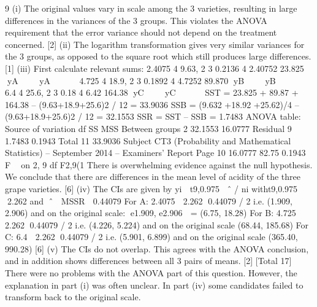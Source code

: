 9 (i) The original values vary in scale among the 3 varieties, resulting in large
differences in the variances of the 3 groups. This violates the ANOVA
requirement that the error variance should not depend on the treatment
concerned. [2]
(ii) The logarithm transformation gives very similar variances for the 3 groups, as
opposed to the square root which still produces large differences. [1]
(iii) First calculate relevant sums:
  2.4075 4 9.63, 2 3 0.2136 4 2.40752 23.825 yA    yA     
4.725 4 18.9, 2 3 0.1892 4 4.7252 89.870 yB    yB     
6.4 4 25.6, 2 3 0.18 4 6.42 164.38 yC    yC     
SST = 23.825 + 89.87 + 164.38 – (9.63+18.9+25.6)2 / 12 = 33.9036
SSB = (9.632 +18.92 +25.62)/4 – (9.63+18.9+25.6)2 / 12 = 32.1553
SSR = SST – SSB = 1.7483
ANOVA table:
  Source of variation df SS MSS
Between groups 2 32.1553 16.0777
Residual 9 1.7483 0.1943
Total 11 33.9036
Subject CT3 (Probability and Mathematical Statistics) – September 2014 – Examiners’ Report
Page 10
16.0777 82.75
0.1943
F  on 2, 9 df
F2,9(1%
There is overwhelming evidence against the null hypothesis. We conclude that
there are differences in the mean level of acidity of the three grape varieties.
[6]
(iv) The CIs are given by
yi  t9,0.975 ˆ / ni witht9,0.975 2.262 and ˆ  MSSR  0.44079
For A: 2.4075  2.262 0.44079 / 2 i.e. (1.909, 2.906)
and on the original scale: e1.909, e2.906  = (6.75, 18.28)
For B: 4.725  2.262 0.44079 / 2 i.e. (4.226, 5.224)
and on the original scale (68.44, 185.68)
For C: 6.4  2.262 0.44079 / 2 i.e. (5.901, 6.899)
and on the original scale (365.40, 990.28) [6]
(v) The CIs do not overlap. This agrees with the ANOVA conclusion, and in
addition shows differences between all 3 pairs of means. [2]
[Total 17]
There were no problems with the ANOVA part of this question. However, the explanation in
part (i) was often unclear. In part (iv) some candidates failed to transform back to the
original scale.
